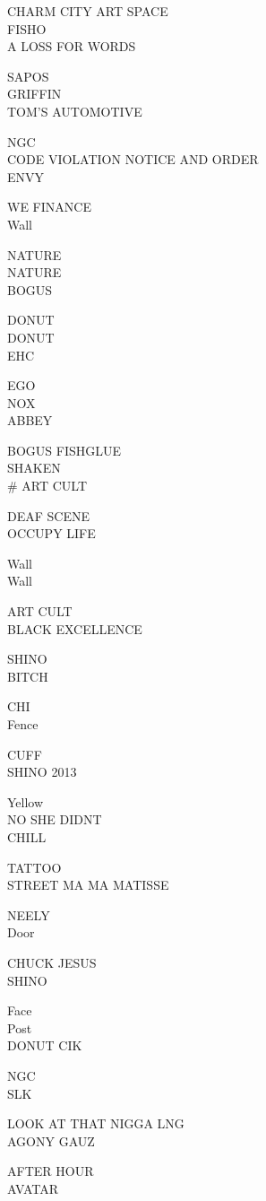 \documentclass[10pt,letterpaper]{article}
\begin{document}
CHARM CITY ART SPACE\\
FISHO\\
A LOSS FOR WORDS

SAPOS\\
GRIFFIN\\
TOM'S AUTOMOTIVE

NGC\\
CODE VIOLATION NOTICE AND ORDER\\
ENVY

WE FINANCE\\
Wall

NATURE\\
NATURE\\
BOGUS

DONUT\\
DONUT\\
EHC

EGO\\
NOX\\
ABBEY

BOGUS FISHGLUE\\
SHAKEN\\
\# ART CULT

DEAF SCENE\\
OCCUPY LIFE

Wall\\
Wall

ART CULT\\
BLACK EXCELLENCE

SHINO\\
BITCH

CHI\\
Fence

CUFF\\
SHINO 2013

Yellow\\
NO SHE DIDNT\\
CHILL

TATTOO\\
STREET MA MA MATISSE

NEELY\\
Door

CHUCK JESUS\\
SHINO

Face\\
Post\\
DONUT CIK

NGC\\
SLK

LOOK AT THAT NIGGA LNG\\
AGONY GAUZ

AFTER HOUR\\
AVATAR
\end{document}
